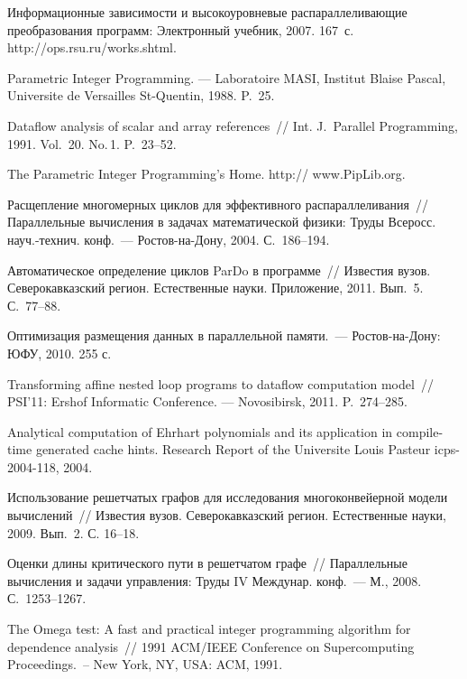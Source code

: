 \begin{multicols}{2}
{{\begin{thebibliography}{99}
 Информационные зависимости и высокоуровневые распараллеливающие 
преобразования программ: Электронный учебник, 2007. 167~с. 
{\sf http://ops.rsu.ru/works.shtml}.

 Parametric Integer Programming. --- Laboratoire MASI, Institut Blaise Pascal, 
Universite  de Versailles St-Quentin, 1988. P.~25.

 Dataflow analysis of scalar and array references~// 
Int. J.~Parallel  Programming, 1991. Vol.~20. No.\,1. P.~23--52.


The Parametric Integer Programming's Home. {\sf http:// www.PipLib.org}.



Расщепление многомерных циклов для эффективного распараллеливания~// 
Параллельные вычисления в задачах математической физики: Труды Всеросс. науч.-технич. конф.~--- 
Ростов-на-Дону, 2004. С.~186--194.

Автоматическое определение цик\-лов ParDo в программе~// Известия вузов. Северокавказский
    регион. Естественные науки. Приложение, 2011. Вып.~5. С.~77--88.

  Оптимизация размещения данных в параллельной 
памяти.~--- Ростов-на-Дону: ЮФУ, 2010. 255 с.

  
Transforming affine nested loop programs to dataflow computation model~// 
PSI'11: Ershof Informatic Conference. --- Novosibirsk, 2011. P.~274--285.

Analytical computation of Ehrhart
    polynomials and its application in compile-time generated cache hints. 
    Research Report of the Universite Louis Pasteur icps-2004-118, 2004.

  
Использование решетчатых графов для исследования многоконвейерной модели вы\-чис\-ле\-ний~// 
Известия вузов. Северокавказский регион. Естественные науки, 2009. Вып.~2. С. 16--18.

 Оценки длины критического пути в решетчатом графе~// 
Параллельные вы\-чис\-ле\-ния и задачи управления: Труды IV Междунар. конф.~--- 
М., 2008. С.~1253--1267.

 The Omega test: A fast and practical integer programming 
algorithm for dependence analysis~// 1991 ACM/IEEE Conference on Supercomputing Proceedings.~-- 
New York, NY, USA: ACM, 1991.


\end{thebibliography}}}
\end{multicols}
